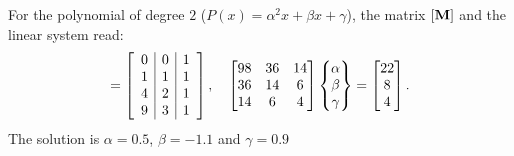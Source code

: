 {For the polynomial of degree $2$ ($P(x)=\alpha^2 x+\beta x+\gamma$), the matrix $[\textbf{M}]$ and the linear system read:
\begin{equation}
[\tb{M}]=\left[
\begin{array}{c|c|c}
0&0 & 1\\
1&1 & 1\\
4&2 & 1\\
9&3 & 1\\	
\end{array}
\right]	\esp
	\begin{bmatrix}
		98 & 36 & 14\\  36 & 14 & 6\\
		14 & 6 & 4
	\end{bmatrix} \begin{Bmatrix}
		\alpha\\  \beta \\ \gamma
	\end{Bmatrix}=
		\begin{bmatrix}
		22\\8 \\  4
	\end{bmatrix}.
\end{equation} 
The solution is $\alpha=0.5$, $\beta=-1.1$ and $\gamma=0.9$

}
